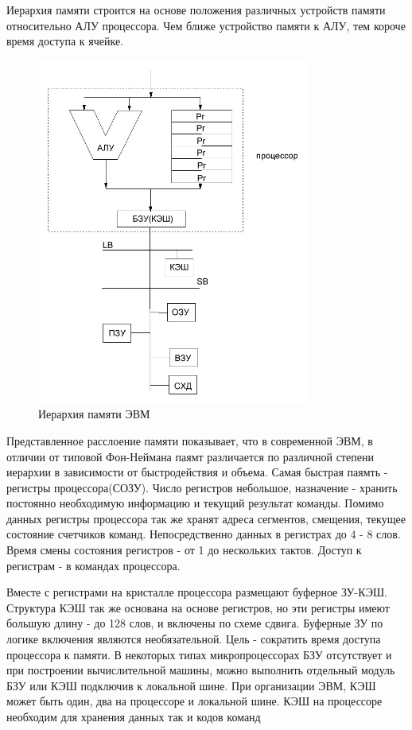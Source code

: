 \documentclass[unicode, 12pt, a4paper, oneside]{article}
\begin{document}
Иерархия памяти строится на основе положения различных устройств памяти относительно АЛУ процессора. Чем ближе устройство памяти к АЛУ, тем короче время доступа к ячейке.

\begin{figure}[H]
\centering
\includegraphics[width=0.8\textwidth]{113_struct.JPG}
\caption{Иерархия памяти ЭВМ}
\end{figure}

Представленное расслоение памяти показывает, что в современной ЭВМ, в отличии от типовой Фон-Неймана паямт различается по различной степени иерархии в зависимости от быстродействия и объема. Самая быстрая паямть - регистры процессора(СОЗУ). Число регистров небольшое, назначение - хранить постоянно необходимую информацию и текущий результат команды. Помимо данных регистры процессора так же хранят адреса сегментов, смещения, текущее состояние счетчиков команд. Непосредственно данных в регистрах до 4 - 8 слов. Время смены состояния регистров - от 1 до нескольких тактов. Доступ к регистрам - в командах процессора.

Вместе с регистрами на кристалле процессора размещают буферное ЗУ-КЭШ. Структура КЭШ так же основана на основе регистров, но эти регистры имеют большую длину - до 128 слов, и включены по схеме сдвига. Буферные ЗУ по логике включения являются необязательной. Цель - сократить время доступа процессора к памяти. В некоторых типах микропроцессорах БЗУ отсутствует и при построении вычислительной машины, можно выполнить отдельный модуль БЗУ или КЭШ подключив к локальной шине. При организации ЭВМ, КЭШ может быть один, два на процессоре и локальной шине. КЭШ на процессоре необходим для хранения данных так и кодов команд
\end{document}
